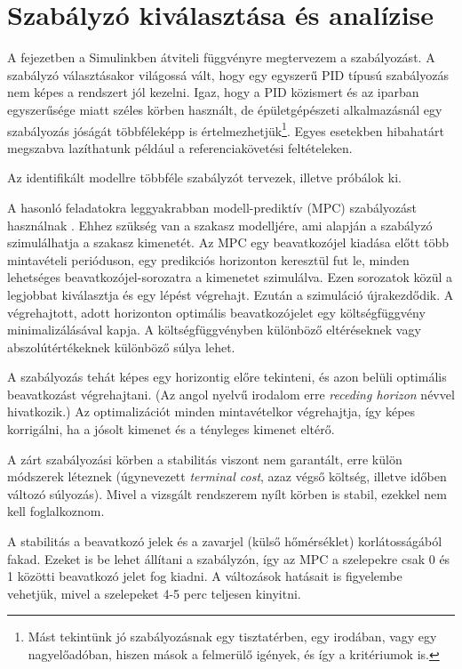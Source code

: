 \chapter{Szabályzó kiválasztása és analízise}\label{chap:control}

A fejezetben a Simulinkben átviteli függvényre megtervezem a szabályozást. A szabályzó választásakor világossá vált, hogy egy egyszerű PID típusú szabályozás nem képes a rendszert jól kezelni. Igaz, hogy a PID közismert és az iparban egyszerűsége miatt széles körben használt, de épületgépészeti alkalmazásnál egy szabályozás jóságát többféleképp is értelmezhetjük\footnote{Mást tekintünk jó szabályozásnak egy tisztatérben, egy irodában, vagy egy nagyelőadóban, hiszen mások a felmerülő igények, és így a kritériumok is.}. Egyes esetekben hibahatárt megszabva lazíthatunk például a referenciakövetési feltételeken.

Az identifikált modellre többféle szabályzót tervezek, illetve próbálok ki.

A hasonló feladatokra leggyakrabban modell-prediktív (MPC) szabályozást használnak \cite{AFRAM2014343}. Ehhez szükség van a szakasz modelljére, ami alapján a szabályzó szimulálhatja a szakasz kimenetét. Az MPC egy beavatkozójel kiadása előtt több mintavételi perióduson, egy predikciós horizonton keresztül fut le, minden lehetséges  beavatkozójel-sorozatra a kimenetet szimulálva.
Ezen sorozatok közül a legjobbat kiválasztja és egy lépést végrehajt. Ezután a szimuláció újrakezdődik. A végrehajtott, adott horizonton optimális beavatkozójelet egy költségfüggvény minimalizálásával kapja. A költségfüggvényben különböző eltéréseknek vagy abszolútértékeknek különböző súlya lehet.

A szabályozás tehát képes egy horizontig előre tekinteni, és azon belüli optimális beavatkozást végrehajtani. (Az angol nyelvű irodalom erre \textit{receding horizon} névvel hivatkozik.) Az optimalizációt minden mintavételkor végrehajtja, így képes korrigálni, ha a jósolt kimenet és a tényleges kimenet eltérő.

A zárt szabályozási körben a stabilitás viszont nem garantált, erre külön módszerek léteznek (úgynevezett \textit{terminal cost}, azaz végső költség, illetve időben változó súlyozás). Mivel a vizsgált rendszerem nyílt körben is stabil, ezekkel nem kell foglalkoznom.

A stabilitás a beavatkozó jelek és a zavarjel (külső hőmérséklet) korlátosságából fakad. Ezeket is be lehet állítani a szabályzón, így az MPC a szelepekre csak 0 és 1 közötti beavatkozó jelet fog kiadni. A változások hatásait is figyelembe vehetjük, mivel a szelepeket 4-5 perc teljesen kinyitni.


